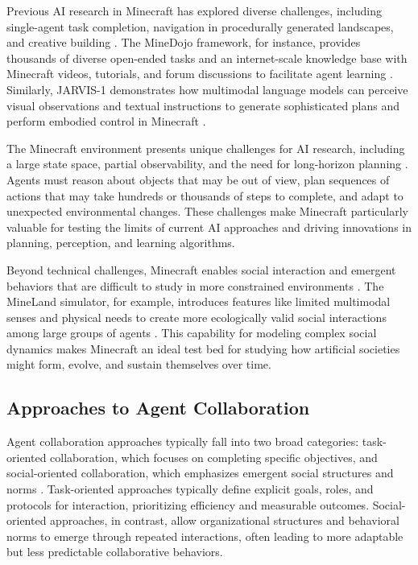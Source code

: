 \documentclass[a4paper, 12pt]{article}
\begin{document}
Previous AI research in Minecraft has explored diverse challenges, including single-agent task completion, navigation in procedurally generated landscapes, and creative building \autocite{zhao2024steveseriesstepbystepconstruction, wang2023jarvis1openworldmultitaskagents}. The MineDojo framework, for instance, provides thousands of diverse open-ended tasks and an internet-scale knowledge base with Minecraft videos, tutorials, and forum discussions to facilitate agent learning \autocite{fan2022minedojobuildingopenendedembodied}. Similarly, JARVIS-1 demonstrates how multimodal language models can perceive visual observations and textual instructions to generate sophisticated plans and perform embodied control in Minecraft \autocite{wang2023jarvis1openworldmultitaskagents}.

The Minecraft environment presents unique challenges for AI research, including a large state space, partial observability, and the need for long-horizon planning \autocite{fan2022minedojobuildingopenendedembodied, wang2023jarvis1openworldmultitaskagents}. Agents must reason about objects that may be out of view, plan sequences of actions that may take hundreds or thousands of steps to complete, and adapt to unexpected environmental changes. These challenges make Minecraft particularly valuable for testing the limits of current AI approaches and driving innovations in planning, perception, and learning algorithms.

Beyond technical challenges, Minecraft enables social interaction and emergent behaviors that are difficult to study in more constrained environments \autocite{al2024projectsidmanyagentsimulations, yu2024minelandsimulatinglargescalemultiagent}. The MineLand simulator, for example, introduces features like limited multimodal senses and physical needs to create more ecologically valid social interactions among large groups of agents \autocite{yu2024minelandsimulatinglargescalemultiagent}. This capability for modeling complex social dynamics makes Minecraft an ideal test bed for studying how artificial societies might form, evolve, and sustain themselves over time.

\subsection{Approaches to Agent Collaboration}

Agent collaboration approaches typically fall into two broad categories: task-oriented collaboration, which focuses on completing specific objectives, and social-oriented collaboration, which emphasizes emergent social structures and norms \autocite{shu2024effectivegenaimultiagentcollaboration,qiu2024collaborativeintelligencepropagatingintentions}. Task-oriented approaches typically define explicit goals, roles, and protocols for interaction, prioritizing efficiency and measurable outcomes. Social-oriented approaches, in contrast, allow organizational structures and behavioral norms to emerge through repeated interactions, often leading to more adaptable but less predictable collaborative behaviors.
\end{document}
